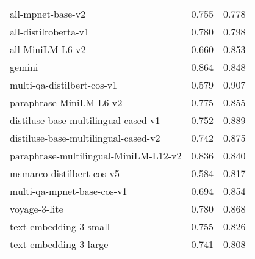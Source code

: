 \begin{table}[ht!]
{\begin{tabular}{lcc}
                    all-mpnet-base-v2 &                                         0.755 &                                0.778 \\
                 all-distilroberta-v1 &                                         0.780 &                                0.798 \\
                     all-MiniLM-L6-v2 &                                         0.660 &                                0.853 \\
                               gemini &                                         0.864 &                                0.848 \\
           multi-qa-distilbert-cos-v1 &                                         0.579 &                                0.907 \\
              paraphrase-MiniLM-L6-v2 &                                         0.775 &                                0.855 \\
 distiluse-base-multilingual-cased-v1 &                                         0.752 &                                0.889 \\
 distiluse-base-multilingual-cased-v2 &                                         0.742 &                                0.875 \\
paraphrase-multilingual-MiniLM-L12-v2 &                                         0.836 &                                0.840 \\
            msmarco-distilbert-cos-v5 &                                         0.584 &                                0.817 \\
           multi-qa-mpnet-base-cos-v1 &                                         0.694 &                                0.854 \\
                        voyage-3-lite &                                         0.780 &                                0.868 \\
               text-embedding-3-small &                                         0.755 &                                0.826 \\
               text-embedding-3-large &                                         0.741 &                                0.808 \\


\end{tabular}}
\end{table}
